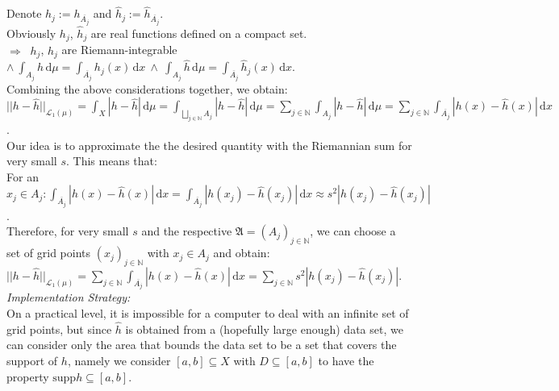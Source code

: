 \documentclass{article}
\begin{document}
Denote $h_j := h_{\overline{A_j}}$ and $\hat{h}_j := \hat{h}_{\overline{A_j}}$.\\ 
Obviously $h_j$, $\hat{h}_j$ are real functions defined on a compact set. \vspace*{0.5em} \\
$\Rightarrow \ $ $h_j$, $\hat{h}_j$ are Riemann-integrable  $\land \  \displaystyle{ \int_{A_j} h\, \text{d} \mu =  \int_{\overline{A_j}} h_j (x) \,\text{d}x   } \ \land \ \displaystyle{ \int_{A_j} \hat{h} \, \text{d} \mu =  \int_{\overline{A_j}} \hat{h}_j (x) \,\text{d}x   }  $. \vspace*{0.5em} \\
Combining the above considerations together, we obtain: \vspace*{0.5em}  \\
$|| h-\hat{h} ||_{\mathcal{L}_1 (\mu)} = \displaystyle{ \int_X |h-\hat{h}|\,\text{d}\mu = \int_{ \bigsqcup_{j\in \mathbb{N}} A_j  } |h-\hat{h}|\,\text{d}\mu = \sum_{j\in \mathbb{N}} \int_{ A_j  } |h-\hat{h}|\,\text{d}\mu =  \sum_{j\in \mathbb{N}} \int_{ \overline{A_j}  } |h(x)-\hat{h}(x)|\,\text{d}x   }$.\vspace*{0.5em}  \\
Our idea is to approximate the the desired quantity with the Riemannian sum for very small $s$. This means that:  \vspace*{0.5em}  \\
For an $x_j \in A_j: \displaystyle{ \int_{ \overline{A_j}  } |h(x)-\hat{h}(x)|\,\text{d}x = \int_{ \overline{A_j}  } |h(x_j)-\hat{h}(x_j)|\,\text{d}x \approx s^2 |h(x_j)-\hat{h}(x_j)|    }$.\vspace*{0.5em}  \\
Therefore, for very small $s$ and the respective $\mathfrak{A}=(A_j)_{j\in \mathbb{N}}$, we can choose a set of grid points $(x_j)_{j\in \mathbb{N}}$ with $x_j \in A_j$ and obtain: \vspace*{0.5em}  \\ 
 $|| h-\hat{h} ||_{\mathcal{L}_1 (\mu)} = \displaystyle{ \sum_{j\in \mathbb{N}} \int_{ \overline{A_j}  } |h(x)-\hat{h}(x)|\,\text{d}x  =  \sum_{j\in \mathbb{N}} s^2 |h(x_j)-\hat{h}(x_j)|   } $. \vspace*{0.8em}  \\ 
\textit{Implementation Strategy:}\\
On a practical level, it is impossible for a computer to deal with an infinite set of grid points, but since $\hat{h}$ is obtained from a (hopefully large enough) data set, we can consider only the area that bounds the data set to be a set that covers the support of $h$, namely we consider $[a,b]\subseteq X $ with $ D\subseteq [a,b]$ to have the property $\text{supp}h \subseteq [a,b]$. \\
\end{document}
